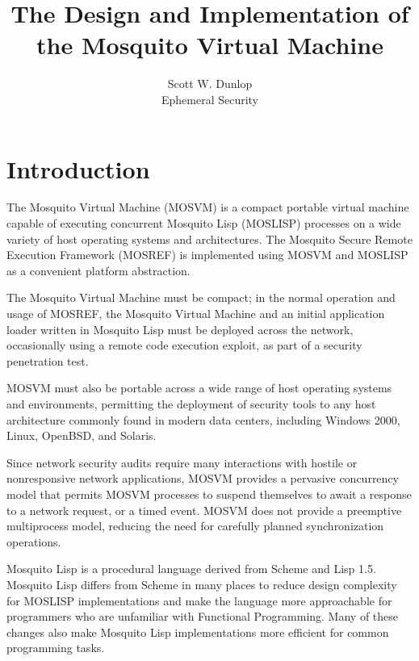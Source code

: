 \documentclass[notitlepage,oneside]{book}
\author{Scott W. Dunlop\\Ephemeral Security}
\title{The Design and Implementation of the Mosquito Virtual Machine}
\begin{document}
\frontmatter

\maketitle
\tableofcontents

\chapter{Introduction}
\label{intro}

The Mosquito Virtual Machine (MOSVM) is a compact portable virtual machine capable of executing concurrent Mosquito Lisp (MOSLISP) processes on a wide variety of host operating systems and architectures.  The Mosquito Secure Remote Execution Framework (MOSREF) is implemented using MOSVM and MOSLISP as a convenient platform abstraction.

The Mosquito Virtual Machine must be compact; in the normal operation and usage of MOSREF, the Mosquito Virtual Machine and an initial application loader written in Mosquito Lisp must be deployed across the network, occasionally using a remote code execution exploit, as part of a security penetration test.

MOSVM must also be portable across a wide range of host operating systems and environments, permitting the deployment of security tools to any host architecture commonly found in modern data centers, including Windows 2000, Linux, OpenBSD, and Solaris.

Since network security audits require many interactions with hostile or nonresponsive network applications, MOSVM provides a pervasive concurrency model that permits MOSVM processes to suspend themselves to await a response to a network request, or a timed event.   MOSVM does not provide a preemptive multiprocess model, reducing the need for carefully planned synchronization operations.

Mosquito Lisp is a procedural language derived from Scheme and Lisp 1.5.  Mosquito Lisp differs from Scheme in many places to reduce design complexity for MOSLISP implementations and make the language more approachable for programmers who are unfamiliar with Functional Programming.  Many of these changes also make Mosquito Lisp implementations more efficient for common programming tasks.

\mainmatter
\end{document}
